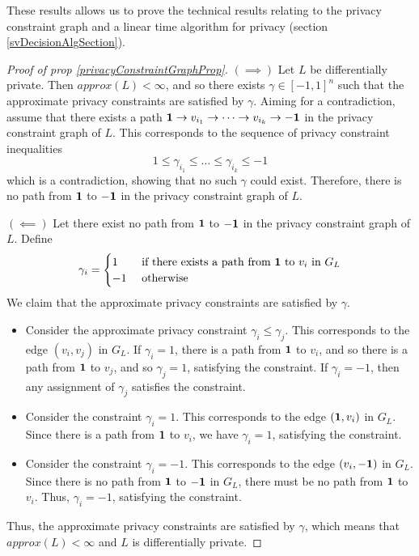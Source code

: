 These results allows us to prove the technical results relating to the privacy constraint graph and a linear time algorithm for privacy (section \ref{svDecisionAlgSection}).

\begin{proof}[Proof of prop \ref{privacyConstraintGraphProp}]
    $(\implies)$ Let $L$ be differentially private. Then $approx(L) < \infty$, and so there exists $\gamma \in [-1, 1]^n$ such that the approximate privacy constraints are satisfied by $\gamma$. Aiming for a contradiction, assume that there exists a path ${\bf 1} \to v_{i_1} \to \dots \to v_{i_k} \to {\bf -1}$ in the privacy constraint graph of $L$. This corresponds to the sequence of privacy constraint inequalities
    \[1 \leq \gamma_{i_1} \leq \dots \leq \gamma_{i_k} \leq -1\]
    which is a contradiction, showing that no such $\gamma$ could exist. Therefore, there is no path from $\bf 1$ to $\bf -1$ in the privacy constraint graph of $L$.

    $(\impliedby)$ Let there exist no path from $\bf 1$ to $\bf -1$ in the privacy constraint graph of $L$. Define 
    \begin{align*}
        \gamma_i = \begin{cases}
            1 &\text{ if there exists a path from } {\bf 1} \text{ to } v_i \text{ in } G_L \\
            -1 &\text{ otherwise}
        \end{cases}
    \end{align*}
    We claim that the approximate privacy constraints are satisfied by $\gamma$.
    
    \begin{itemize}
        \item Consider the approximate privacy constraint $\gamma_i \leq \gamma_j$. This corresponds to the edge $(v_i, v_j)$ in $G_L$. If $\gamma_i = 1$, there is a path from $\bf 1$ to $v_i$, and so there is a path from $\bf 1$ to $v_j$, and so $\gamma_j = 1$, satisfying the constraint. If $\gamma_i = -1$, then any assignment of $\gamma_j$ satisfies the constraint. 
        \item Consider the constraint $\gamma_i = 1$. This corresponds to the edge $({\bf 1}, v_i)$ in $G_L$. Since there is a path from $\bf 1$ to $v_i$, we have $\gamma_i = 1$, satisfying the constraint.
        \item Consider the constraint $\gamma_i = -1$. This corresponds to the edge $(v_i, {\bf -1})$ in $G_L$. Since there is no path from $\bf 1$ to $\bf -1$ in $G_L$, there must be no path from $\bf 1$ to $v_i$. Thus, $\gamma_i = -1$, satisfying the constraint.
    \end{itemize}
    
    Thus, the approximate privacy constraints are satisfied by $\gamma$, which means that $approx(L) < \infty$ and $L$ is differentially private.
\end{proof}

